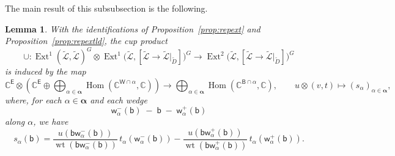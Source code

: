 \documentclass[dvipsnames,11pt]{article}
\newtheorem{lemma}[theorem]{Lemma}
\theoremstyle{definition}
\newcommand{\wt}{\operatorname{wt}}
\newcommand{\C}{{\mathbb C}}
\def\B{\mathsf B}
\def\W{\mathsf W}
\def\w{\mathsf w}
\def\b{\mathsf b}
\def\E{\mathsf E}
\def\zz{\bm \alpha}
\def\Ext{\operatorname{Ext}}
\def\Ext{\operatorname{Ext}}
\DeclareMathOperator{\Hom}{Hom}
\begin{document}
The main result of this subsubsection is the following.

\begin{lemma}\label{lem::cup}
With the identifications of Proposition~\ref{prop:repext} and Proposition~\ref{prop:repextld}, the cup product
\[
\cup:
\Ext^1(\widetilde{\mathcal L},\widetilde{\mathcal L})^G
\otimes
\Ext^1\!\bigl(\widetilde{\mathcal L},[\widetilde{\mathcal L}\to \widetilde{\mathcal L}|_{\widetilde D}]\bigr)^G
\rightarrow
\Ext^2\!\bigl(\widetilde{\mathcal L},[\widetilde{\mathcal L}\to \widetilde{\mathcal L}|_{\widetilde D}]\bigr)^G
\]
is induced by the map
\[
\C^\E \otimes
\left(
\C^\E \oplus \bigoplus_{\alpha\in\zz}\Hom(\C^{\W\cap\alpha},\C)
\right)
\rightarrow
\bigoplus_{\alpha\in\zz}\Hom(\C^{\B\cap\alpha},\C),
\qquad
u\otimes(v,t)\mapsto (s_\alpha)_{\alpha\in\zz},
\]
where, for each \(\alpha\in\zz\) and each wedge
\[
\w_\alpha^{-}(\b)\;-\;\b\;-\;\w_\alpha^{+}(\b)
\]
along \(\alpha\), we have
\[
s_\alpha(\b)
=
\frac{u(\b \w_\alpha^{-}(\b))}{\wt(\b\w_\alpha^{-}(\b))}\,t_\alpha(\w_\alpha^{-}(\b))
-
\frac{u(\b \w_\alpha^{+}(\b))}{\wt(\b\w_\alpha^{+}(\b))}\,t_\alpha(\w_\alpha^{+}(\b)).
\]
\end{lemma}
\end{document}
